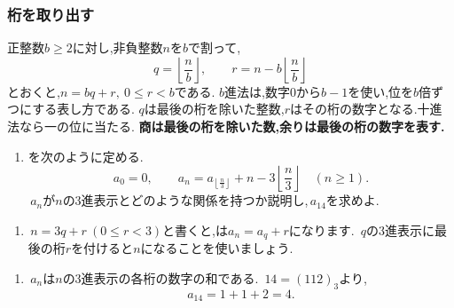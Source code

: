   \subsubsection{桁を取り出す}\label{節：ガウス型の桁の抽出}
    正整数$b\ge2$に対し,非負整数$n$を$b$で割って,
    \[
      q=\left\lfloor\frac nb\right\rfloor,
      \qquad r=n-b\left\lfloor\frac nb\right\rfloor
    \]
    とおくと,$n=bq+r,\ 0\le r<b$である.
    $b$進法は,数字0から$b-1$を使い,位を$b$倍ずつにする表し方である.
    $q$は最後の桁を除いた整数,$r$はその桁の数字となる.十進法なら一の位に当たる.
    \textbf{商は最後の桁を除いた数,余りは最後の桁の数字を表す.}

    \noindent {}\par\nobreak
    \begin{enumerate}[label=(\arabic*),parsep=3pt,beginpenalty=10000,format=\bookitemlink{example-gauss-role-8}{problem}{answer}]
      \item {}を次のように定める.
            \[
              a_0=0,\qquad
              a_n=a_{\left\lfloor\frac n3\right\rfloor}
                  +n-3\left\lfloor\frac n3\right\rfloor
              \quad(n\ge1).
            \]
            \,$a_n$が$n$の3進表示とどのような関係を持つか説明し,\,$a_{14}$を求めよ.
    \end{enumerate}

    \noindent {}\par\nobreak
    \begin{enumerate}[label=(\arabic*),parsep=3pt,beginpenalty=10000,format=\bookitemlink{example-gauss-role-8}{hint}{problem}]
      \item \,$n=3q+r\ (0\le r<3)$と書くと,は$a_n=a_q+r$になります.
            \,$q$の3進表示に最後の桁$r$を付けると$n$になることを使いましょう.
    \end{enumerate}

    \noindent {}\par\nobreak
    \begin{enumerate}[label=(\arabic*),parsep=3pt,beginpenalty=10000,format=\bookitemlink{example-gauss-role-8}{answer}{problem}]
      \item \,$a_n$は$n$の3進表示の各桁の数字の和である.
            \,$14=(112)_3$より,
            \[
              a_{14}=1+1+2=4.
            \]
    \end{enumerate}

